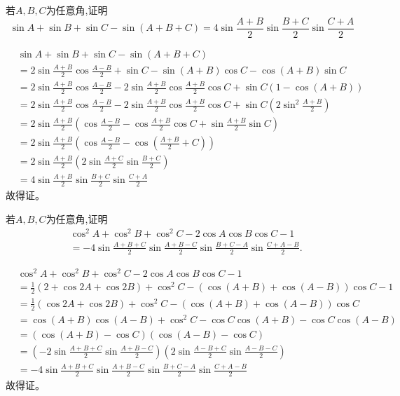 \begin{questions}
    \question 若$A,B,C$为任意角,证明
    \[
    \sin A + \sin B + \sin C - \sin(A+B+C) = 4 \sin \frac{A+B}{2} \sin \frac{B+C}{2} \sin \frac{C+A}{2} 
    \]
    \begin{solution}
        \begin{align*}
        &\sin A + \sin B + \sin C - \sin(A+B+C) \\
        &= 2 \sin \frac{A+B}{2} \cos \frac{A-B}{2} + \sin C - \sin(A+B)\cos C - \cos(A+B)\sin C \\
        &= 2 \sin \frac{A+B}{2} \cos \frac{A-B}{2} - 2 \sin \frac{A+B}{2} \cos \frac{A+B}{2} \cos C + \sin C (1-\cos(A+B)) \\
        &= 2 \sin \frac{A+B}{2} \cos \frac{A-B}{2} - 2 \sin \frac{A+B}{2} \cos \frac{A+B}{2} \cos C + \sin C \left(2\sin^2 \frac{A+B}{2}\right) \\
        &= 2 \sin \frac{A+B}{2} \left( \cos \frac{A-B}{2} - \cos \frac{A+B}{2} \cos C + \sin \frac{A+B}{2} \sin C \right) \\
        &= 2 \sin \frac{A+B}{2} \left( \cos \frac{A-B}{2} - \cos \left(\frac{A+B}{2}+C\right) \right) \\
        &= 2 \sin \frac{A+B}{2} \left( 2 \sin \frac{A+C}{2} \sin \frac{B+C}{2} \right) \\
        &= 4 \sin \frac{A+B}{2} \sin \frac{B+C}{2} \sin \frac{C+A}{2}
        \end{align*}
        故得证。
    \end{solution}

    \question 若$A,B,C$为任意角,证明
    \begin{align*}
    &\cos^2 A + \cos^2 B + \cos^2 C - 2 \cos A \cos B \cos C - 1 \\
    &= -4 \sin \frac{A+B+C}{2} \sin \frac{A+B-C}{2} \sin \frac{B+C-A}{2} \sin \frac{C+A-B}{2}.
    \end{align*}
    \begin{solution}
        \begin{align*}
        &\cos^2 A + \cos^2 B + \cos^2 C - 2 \cos A \cos B \cos C - 1 \\
        &= \frac{1}{2}(2+\cos 2A+\cos 2B) + \cos^2 C - (\cos(A+B) + \cos(A-B)) \cos C - 1 \\
        &= \frac{1}{2}(\cos 2A+\cos 2B) + \cos^2 C - (\cos(A+B) + \cos(A-B)) \cos C \\
        &= \cos(A+B)\cos(A-B) + \cos^2 C - \cos C \cos(A+B) - \cos C \cos(A-B) \\
        &= (\cos(A+B) - \cos C)(\cos(A-B) - \cos C) \\
        &= \left(-2 \sin \frac{A+B+C}{2} \sin \frac{A+B-C}{2}\right) \left(2 \sin \frac{A-B+C}{2} \sin \frac{A-B-C}{2}\right) \\
        &= -4 \sin \frac{A+B+C}{2} \sin \frac{A+B-C}{2} \sin \frac{B+C-A}{2} \sin \frac{C+A-B}{2}
        \end{align*}
        故得证。
    \end{solution}


\end{questions}

